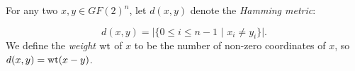 \documentclass[12pt]{article}
\begin{document}





For any two $x,y \in GF(2)^{n}$,
let $d(x,y)$ denote the {\it Hamming metric}:

\begin{equation}
d(x,y)=|\{0\leq i\leq n-1\,\,|\,\,
x_{i}\not=y_{i}\}|.
\end{equation}
We define the {\it weight} ${\rm wt}$ of $x$ to be the number
of non-zero coordinates of $x$, so $d(x,y)={\rm wt}(x-y)$.
\end{document}
